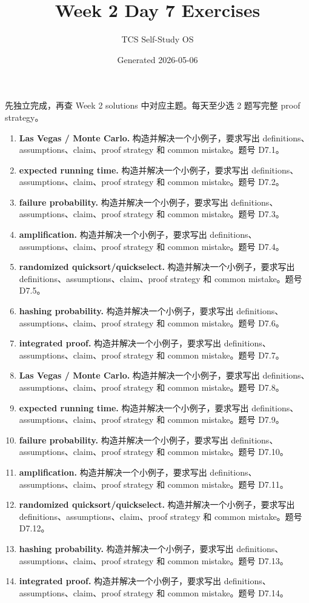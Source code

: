 \documentclass[11pt]{ctexart}
\title{Week 2 Day 7 Exercises}
\author{TCS Self-Study OS}
\date{Generated 2026-05-06}
\begin{document}
\maketitle
先独立完成，再查 Week 2 solutions 中对应主题。每天至少选 2 题写完整 proof strategy。
\begin{enumerate}
  \item \textbf{Las Vegas / Monte Carlo.} 构造并解决一个小例子，要求写出 definitions、assumptions、claim、proof strategy 和 common mistake。题号 D7.1。
  \item \textbf{expected running time.} 构造并解决一个小例子，要求写出 definitions、assumptions、claim、proof strategy 和 common mistake。题号 D7.2。
  \item \textbf{failure probability.} 构造并解决一个小例子，要求写出 definitions、assumptions、claim、proof strategy 和 common mistake。题号 D7.3。
  \item \textbf{amplification.} 构造并解决一个小例子，要求写出 definitions、assumptions、claim、proof strategy 和 common mistake。题号 D7.4。
  \item \textbf{randomized quicksort/quickselect.} 构造并解决一个小例子，要求写出 definitions、assumptions、claim、proof strategy 和 common mistake。题号 D7.5。
  \item \textbf{hashing probability.} 构造并解决一个小例子，要求写出 definitions、assumptions、claim、proof strategy 和 common mistake。题号 D7.6。
  \item \textbf{integrated proof.} 构造并解决一个小例子，要求写出 definitions、assumptions、claim、proof strategy 和 common mistake。题号 D7.7。
  \item \textbf{Las Vegas / Monte Carlo.} 构造并解决一个小例子，要求写出 definitions、assumptions、claim、proof strategy 和 common mistake。题号 D7.8。
  \item \textbf{expected running time.} 构造并解决一个小例子，要求写出 definitions、assumptions、claim、proof strategy 和 common mistake。题号 D7.9。
  \item \textbf{failure probability.} 构造并解决一个小例子，要求写出 definitions、assumptions、claim、proof strategy 和 common mistake。题号 D7.10。
  \item \textbf{amplification.} 构造并解决一个小例子，要求写出 definitions、assumptions、claim、proof strategy 和 common mistake。题号 D7.11。
  \item \textbf{randomized quicksort/quickselect.} 构造并解决一个小例子，要求写出 definitions、assumptions、claim、proof strategy 和 common mistake。题号 D7.12。
  \item \textbf{hashing probability.} 构造并解决一个小例子，要求写出 definitions、assumptions、claim、proof strategy 和 common mistake。题号 D7.13。
  \item \textbf{integrated proof.} 构造并解决一个小例子，要求写出 definitions、assumptions、claim、proof strategy 和 common mistake。题号 D7.14。
\end{enumerate}
\end{document}
